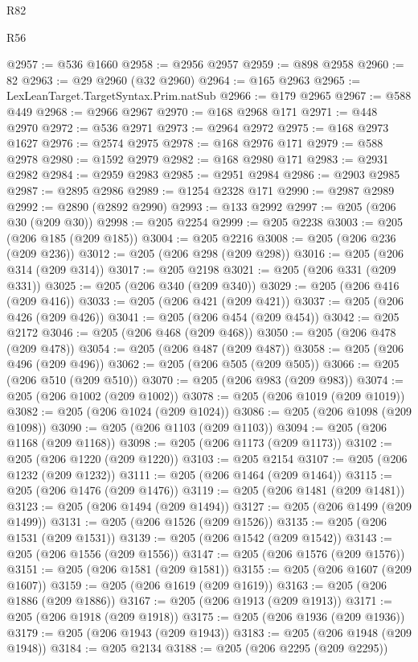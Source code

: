 \begin{lexlean}{R82}
\begin{lexlean}{R56}
\begin{coremodule}
{{{{{{{{{{{{{{{{{{{{{{{{{{{{{{{{{{{{{{{{{{{{{{{{{{{{{{{{{{{{{{{{{{{{{{{{{{{{{{{{{{{{{{{{{{{{{{{{{{{{{{{{{{{{{{{{{{{{{{{{{{{{{{{{{{{{{{{{{{{{{{{{{{{{{{{{{{{{{{{{{{{{{{{{{{{{{{{{{{{{{{{{{{{{{{{{{{{{{{{{{{{{{{{{{{{@2957 := @536 @1660
@2958 := @2956 @2957
@2959 := @898 @2958
@2960 := 82
@2963 := @29 @2960 (@32 @2960)
@2964 := @165 @2963
@2965 := LexLeanTarget.TargetSyntax.Prim.natSub
@2966 := @179 @2965
@2967 := @588 @449
@2968 := @2966 @2967
@2970 := @168 @2968 @171
@2971 := @448 @2970
@2972 := @536 @2971
@2973 := @2964 @2972
@2975 := @168 @2973 @1627
@2976 := @2574 @2975
@2978 := @168 @2976 @171
@2979 := @588 @2978
@2980 := @1592 @2979
@2982 := @168 @2980 @171
@2983 := @2931 @2982
@2984 := @2959 @2983
@2985 := @2951 @2984
@2986 := @2903 @2985
@2987 := @2895 @2986
@2989 := @1254 @2328 @171
@2990 := @2987 @2989
@2992 := @2890 (@2892 @2990)
@2993 := @133 @2992
@2997 := @205 (@206 @30 (@209 @30))
@2998 := @205 @2254
@2999 := @205 @2238
@3003 := @205 (@206 @185 (@209 @185))
@3004 := @205 @2216
@3008 := @205 (@206 @236 (@209 @236))
@3012 := @205 (@206 @298 (@209 @298))
@3016 := @205 (@206 @314 (@209 @314))
@3017 := @205 @2198
@3021 := @205 (@206 @331 (@209 @331))
@3025 := @205 (@206 @340 (@209 @340))
@3029 := @205 (@206 @416 (@209 @416))
@3033 := @205 (@206 @421 (@209 @421))
@3037 := @205 (@206 @426 (@209 @426))
@3041 := @205 (@206 @454 (@209 @454))
@3042 := @205 @2172
@3046 := @205 (@206 @468 (@209 @468))
@3050 := @205 (@206 @478 (@209 @478))
@3054 := @205 (@206 @487 (@209 @487))
@3058 := @205 (@206 @496 (@209 @496))
@3062 := @205 (@206 @505 (@209 @505))
@3066 := @205 (@206 @510 (@209 @510))
@3070 := @205 (@206 @983 (@209 @983))
@3074 := @205 (@206 @1002 (@209 @1002))
@3078 := @205 (@206 @1019 (@209 @1019))
@3082 := @205 (@206 @1024 (@209 @1024))
@3086 := @205 (@206 @1098 (@209 @1098))
@3090 := @205 (@206 @1103 (@209 @1103))
@3094 := @205 (@206 @1168 (@209 @1168))
@3098 := @205 (@206 @1173 (@209 @1173))
@3102 := @205 (@206 @1220 (@209 @1220))
@3103 := @205 @2154
@3107 := @205 (@206 @1232 (@209 @1232))
@3111 := @205 (@206 @1464 (@209 @1464))
@3115 := @205 (@206 @1476 (@209 @1476))
@3119 := @205 (@206 @1481 (@209 @1481))
@3123 := @205 (@206 @1494 (@209 @1494))
@3127 := @205 (@206 @1499 (@209 @1499))
@3131 := @205 (@206 @1526 (@209 @1526))
@3135 := @205 (@206 @1531 (@209 @1531))
@3139 := @205 (@206 @1542 (@209 @1542))
@3143 := @205 (@206 @1556 (@209 @1556))
@3147 := @205 (@206 @1576 (@209 @1576))
@3151 := @205 (@206 @1581 (@209 @1581))
@3155 := @205 (@206 @1607 (@209 @1607))
@3159 := @205 (@206 @1619 (@209 @1619))
@3163 := @205 (@206 @1886 (@209 @1886))
@3167 := @205 (@206 @1913 (@209 @1913))
@3171 := @205 (@206 @1918 (@209 @1918))
@3175 := @205 (@206 @1936 (@209 @1936))
@3179 := @205 (@206 @1943 (@209 @1943))
@3183 := @205 (@206 @1948 (@209 @1948))
@3184 := @205 @2134
@3188 := @205 (@206 @2295 (@209 @2295))
}}}}}}}}}}}}}}}}}}}}}}}}}}}}}}}}}}}}}}}}}}}}}}}}}}}}}}}}}}}}}}}}}}}}}}}}}}}}}}}}}}}}}}}}}}}}}}}}}}}}}}}}}}}}}}}}}}}}}}}}}}}}}}}}}}}}}}}}}}}}}}}}}}}}}}}}}}}}}}}}}}}}}}}}}}}}}}}}}}}}}}}}}}}}}}}}}}}}}}}}}}}}}}}}}}}
\end{coremodule}
\end{lexlean}
\end{lexlean}
